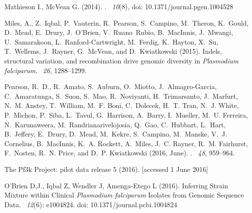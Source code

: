 \documentclass{bioinfo}
\begin{document}
\begin{thebibliography}{}
Mathieson I., McVean G. (2014).
. 
~{\em 10}(8), doi: 10.1371/journal.pgen.1004528


Miles, A., Z.~Iqbal, P.~Vauterin, R.~Pearson, S.~Campino, M.~Theron, K.~Gould,
  D.~Mead, E.~Drury, J.~O{\textquoteright}Brien, V.~Ruano~Rubio, B.~MacInnis,
  J.~Mwangi, U.~Samarakoon, L.~Ranford-Cartwright, M.~Ferdig, K.~Hayton, X.~Su,
  T.~Wellems, J.~Rayner, G.~McVean, and D.~Kwiatkowski (2015).
\newblock Indels, structural variation, and recombination drive genomic diversity in {\it Plasmodium falciparum}.
~{\em26\/}, 1288--1299.

Pearson, R.~D., R.~Amato, S.~Auburn, O.~Miotto, J.~Almagro-Garcia,
  C.~Amaratunga, S.~Suon, S.~Mao, R.~Noviyanti, H.~Trimarsanto, J.~Marfurt,
  N.~M. Anstey, T.~William, M.~F. Boni, C.~Dolecek, H.~T. Tran, N.~J. White,
  P.~Michon, P.~Siba, L.~Tavul, G.~Harrison, A.~Barry, I.~Mueller, M.~U.
  Ferreira, N.~Karunaweera, M.~Randrianarivelojosia, Q.~Gao, C.~Hubbart,
  L.~Hart, B.~Jeffery, E.~Drury, D.~Mead, M.~Kekre, S.~Campino, M.~Manske,
  V.~J. Cornelius, B.~MacInnis, K.~A. Rockett, A.~Miles, J.~C. Rayner, R.~M.
  Fairhurst, F.~Nosten, R.~N. Price, and D.~P. Kwiatkowski (2016, June).
.
~{\em 48}, 959--964.

The Pf3k Project: pilot data release 5 (2016).
 [accessed 1 June 2016]

O'Brien D,J., Iqbal Z, Wendler J, Amenga-Etego L (2016). \newblock Inferring Strain Mixture within Clinical {\em Plasmodium falciparum} Isolates from Genomic Sequence Data. ~{\em 12\/}(6): e1004824. doi: 10.1371/journal.pcbi.1004824


\end{thebibliography}
\end{document}

